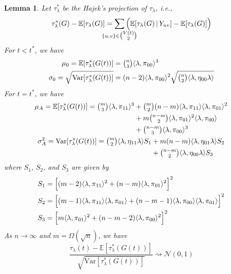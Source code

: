 \documentclass[final]{IEEEtran}
\newtheorem{lemma}[theorem]{Lemma}
\theoremstyle{definition}
\def\clap#1{\hbox to 0pt{\hss#1\hss}}
\def\mathclap{\mathpalette\mathclapinternal}
\def\mathclapinternal#1#2{%
\clap{$\mathsurround=0pt#1{#2}$}%
}
\begin{document}
\begin{lemma}
  \label{lem:3}
  Let $\tau_{\lambda}^{*}$ be the Hajek's projection of $\tau_{\lambda}$, i.e.,
\begin{equation}
  \label{eq:46}
  \tau_{\lambda}^{*}(G) - \mathbb{E}[\tau_{\lambda}(G)] =
  \sum_{\mathclap{\{u,v\} \in \tbinom{V(t)}{2}}} \, \Bigl(\mathbb{E}[
  \tau_{\lambda}(G) \, \lvert \, Y_{uv}] -
  \mathbb{E}[\tau_{\lambda}(G)]\Bigr)
\end{equation}
For $t < t^{*}$, we have
\begin{align*}
  \mu_0 = \mathbb{E}[\tau_{\lambda}^{*}(G(t))] &= \tbinom{n}{3} \langle 
  \lambda, \pi_{00} \rangle^{3} \\
  \sigma_0 = \sqrt{\mathrm{Var}[\tau_{\lambda}^{*}(G(t))]} &= (n-2) \langle \lambda,
  \pi_{00} \rangle^{2} \sqrt{\tbinom{n}{2} \langle \lambda, \eta_{00}
  \lambda \rangle}
\end{align*}
For $t = t^{*}$, we have
  \begin{gather*}
    \label{eq:42}
    \begin{split}
    \mu_A = \mathbb{E}[\tau_{\lambda}^{*}(G(t))] = \tbinom{m}{3}
    \langle \lambda, \pi_{11} \rangle^{3} &+
    \tbinom{m}{2}(n-m) \langle \lambda, \pi_{11} \rangle \langle
    \lambda, \pi_{01} \rangle^{2} \\ &+ m \tbinom{n-m}{2} \langle \lambda,
    \pi_{01} \rangle^{2} \langle \lambda, \pi_{00} \rangle \\ &+
    \tbinom{n-m}{3} \langle \lambda, \pi_{00} \rangle^{3}
    \end{split} \\
    \begin{split}
    \sigma_A^{2} = \mathrm{Var}[\tau_{\lambda}^{*}(G(t))] = \tbinom{m}{2} \langle \lambda, \eta_{11} \lambda
    \rangle S_1  
    &+ m(n-m) \langle \lambda, \eta_{01} \lambda \rangle S_2  \\
    &+ \tbinom{n-m}{2} \langle \lambda, \eta_{00} \lambda \rangle S_3
    \end{split}
  \end{gather*}
  where $S_1$, $S_2$, and $S_3$ are given by
\begin{align*}
    S_1 &= \Bigl[(m-2) \langle \lambda, \pi_{11} \rangle^{2} + (n-m)
    \langle \lambda, \pi_{01} \rangle^{2} \Bigr]^{2} \\ 
    S_2 &= \Bigl[(m-1)
    \langle \lambda, \pi_{11} \rangle \langle \lambda, \pi_{01}
    \rangle + (n-m-1) \langle \lambda, \pi_{00} \rangle \langle
    \lambda, \pi_{01} \rangle \Bigr]^{2} \\
    S_3 &= \Bigl[m \langle \lambda, \pi_{01} \rangle^{2} + (n-m-2) \langle
    \lambda, \pi_{00} \rangle^{2} \Bigr]^{2} 
    \end{align*}
  As $n \rightarrow \infty$ and $m = \Omega(\sqrt{n})$, we have
  \begin{equation}
    \label{eq:49}
    \frac{\tau_{\lambda}(t) -
      \mathbb{E}[\tau_{\lambda}^{*}(G(t))]}{\sqrt{\mathrm{Var}[\tau_{\lambda}^{*}(G(t))]}}
      \rightsquigarrow \mathcal{N}(0,1)
  \end{equation}
\end{lemma}
\end{document}
